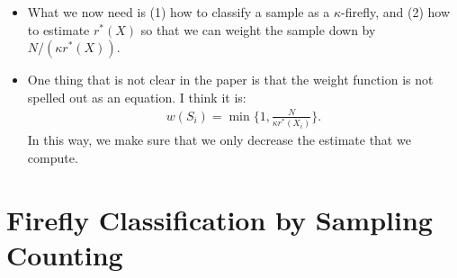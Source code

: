 \documentclass[10pt]{article}
\begin{document}
\begin{itemize}
  	\item What we now need is (1) how to classify a sample as a $\kappa$-firefly, and (2) how to estimate $r^*(X)$ so that we can weight the sample down by $N/(\kappa r^*(X))$.

  	\item One thing that is not clear in the paper is that the weight function is not spelled out as an equation. I think it is:
  	\begin{align*}
  		w(S_i) = \min\bigg\{ 1, \frac{N}{\kappa r^*(X_i)} \bigg\}.
  	\end{align*}
  	In this way, we make sure that we only decrease the estimate that we compute.

  \end{itemize}

  \section{Firefly Classification by Sampling Counting}
\end{document}
